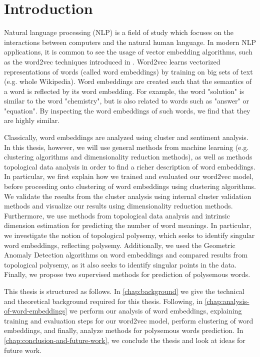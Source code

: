 \chapter{Introduction}
\label{chap:introduction}
Natural language processing (NLP) is a field of study which focuses on the interactions between computers and the natural human language. In modern NLP applications, it is common to see the usage of vector embedding algorithms, such as the word2vec techniques introduced in \cite{mikolov2013a}. Word2vec learns vectorized representations of words (called word embeddings) by training on big sets of text (e.g. whole Wikipedia). Word embeddings are created such that the semantics of a word is reflected by its word embedding. For example, the word "solution" is similar to the word "chemistry", but is also related to words such as "answer" or "equation". By inspecting the word embeddings of such words, we find that they are highly similar.

Classically, word embeddings are analyzed using cluster and sentiment analysis. In this thesis, however, we will use general methods from machine learning (e.g. clustering algorithms and dimensionality reduction methods), as well as methods topological data analysis in order to find a richer description of word embeddings. In particular, we first explain how we trained and evaluated our word2vec model, before proceeding onto clustering of word embeddings using clustering algorithms. We validate the results from the cluster analysis using internal cluster validation methods and visualize our results using dimensionality reduction methods. Furthermore, we use methods from topological data analysis and intrinsic dimension estimation for predicting the number of word meanings. In particular, we investigate the notion of topological polysemy, which seeks to identify singular word embeddings, reflecting polysemy. Additionally, we used the Geometric Anomaly Detection algorithms on word embeddings and compared results from topological polysemy, as it also seeks to identify singular points in the data. Finally, we propose two supervised methods for prediction of polysemous words.

This thesis is structured as follows. In \cref{chap:background} we give the technical and theoretical background required for this thesis. Following, in \cref{chap:analysis-of-word-embeddings} we perform our analysis of word embeddings, explaining training and evaluation steps for our word2vec model, perform clustering of word embeddings, and finally, analyze methods for polysemous words prediction. In \cref{chap:conclusion-and-future-work}, we conclude the thesis and look at ideas for future work.